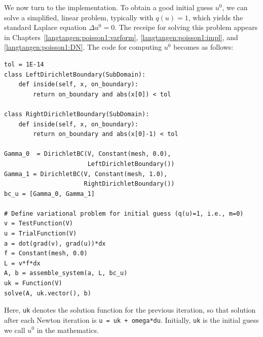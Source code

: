 We now turn to the implementation.
To obtain a good initial guess $u^0$, we can solve a simplified, linear
problem, typically with $q(u)=1$, which yields the standard Laplace
equation $\Delta u^0 =0$. The receipe for solving this problem
appears in Chapters~\ref{langtangen:poisson1:varform},
\ref{langtangen:poisson1:impl}, and \ref{langtangen:poisson1:DN}.
The code for computing $u^0$ becomes as follows:
\begin{Verbatim}[fontsize=\fontsize{10pt}{10pt},tabsize=8,baselinestretch=1.05,
fontfamily=tt,xleftmargin=7mm]
tol = 1E-14
class LeftDirichletBoundary(SubDomain):
    def inside(self, x, on_boundary):
        return on_boundary and abs(x[0]) < tol

class RightDirichletBoundary(SubDomain):
    def inside(self, x, on_boundary):
        return on_boundary and abs(x[0]-1) < tol

Gamma_0  = DirichletBC(V, Constant(mesh, 0.0),
                       LeftDirichletBoundary())
Gamma_1 = DirichletBC(V, Constant(mesh, 1.0),
                      RightDirichletBoundary())
bc_u = [Gamma_0, Gamma_1]

# Define variational problem for initial guess (q(u)=1, i.e., m=0)
v = TestFunction(V)
u = TrialFunction(V)
a = dot(grad(v), grad(u))*dx
f = Constant(mesh, 0.0)
L = v*f*dx
A, b = assemble_system(a, L, bc_u)
uk = Function(V)
solve(A, uk.vector(), b)
\end{Verbatim}
\noindent
Here, {\fontsize{12pt}{12pt}\texttt{uk}} denotes the solution function for the previous
iteration, so that solution
after each Newton iteration is {\fontsize{12pt}{12pt}\texttt{u = uk + omega*du}}.
Initially, {\fontsize{12pt}{12pt}\texttt{uk}} is the initial guess we call $u^0$ in the mathematics.


